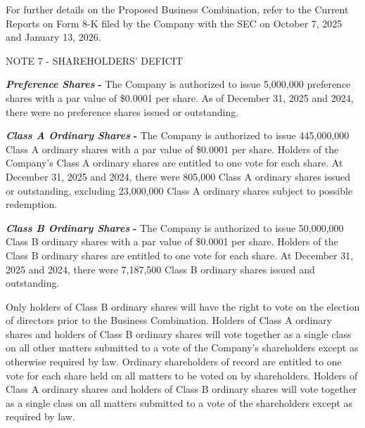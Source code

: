 \documentclass[11pt,a4paper]{article}
\begin{document}
For further details on the Proposed Business Combination, refer to the Current Reports on Form 8-K filed by the Company with the SEC on October 7, 2025 and January 13, 2026.

NOTE 7 - SHAREHOLDERS' DEFICIT

\textit{\textbf{Preference Shares}} \textbf{-} The Company is authorized to issue 5,000,000 preference shares with a par value of \$0.0001 per share. As of December 31, 2025 and 2024, there were no preference shares issued or outstanding.

\textit{\textbf{Class A Ordinary Shares}} \textbf{-} The Company is authorized to issue 445,000,000 Class A ordinary shares with a par value of \$0.0001 per share. Holders of the Company's Class A ordinary shares are entitled to one vote for each share. At December 31, 2025 and 2024, there were 805,000 Class A ordinary shares issued or outstanding, excluding 23,000,000 Class A ordinary shares subject to possible redemption.

\textit{\textbf{Class B Ordinary Shares}} \textbf{-} The Company is authorized to issue 50,000,000 Class B ordinary shares with a par value of \$0.0001 per share. Holders of the Class B ordinary shares are entitled to one vote for each share. At December 31, 2025 and 2024, there were 7,187,500 Class B ordinary shares issued and outstanding.

Only holders of Class B ordinary shares will have the right to vote on the election of directors prior to the Business Combination. Holders of Class A ordinary shares and holders of Class B ordinary shares will vote together as a single class on all other matters submitted to a vote of the Company's shareholders except as otherwise required by law. Ordinary shareholders of record are entitled to one vote for each share held on all matters to be voted on by shareholders. Holders of Class A ordinary shares and holders of Class B ordinary shares will vote together as a single class on all matters submitted to a vote of the shareholders except as required by law.
\end{document}
